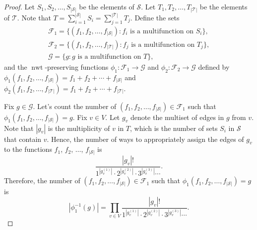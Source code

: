 \documentclass[11pt]{article}
\theoremstyle{definition}
\numberwithin{equation}{section}
\newcommand{\mtp}[1]{^{(#1)}} \newcommand{\graph}{\varGamma}
\newcommand{\vertices}{V}
\DeclareMathOperator{\normalizedweight}{nwt}
\begin{document}
\begin{proof}
    Let \(S_1, S_2, \dots, S_{|\mathcal{S}|}\) be the elements of \(\mathcal{S}\).
    Let \(T_1, T_2, \dots, T_{|\mathcal{T}|}\) be the elements of \(\mathcal{T}\).
    Note that \(T = \sum_{i=1}^{|\mathcal{S}|} S_i = \sum_{j=1}^{|\mathcal{T}|} T_j\).
    Define the sets
    \begin{gather*}
        \mathcal{F}_1 = \{ (f_1, f_2, \dots, f_{|\mathcal{S}|}) : f_i \text{ is a multifunction on } S_i \}, \\
        \mathcal{F}_2 = \{ (f_1, f_2, \dots, f_{|\mathcal{T}|}) : f_j \text{ is a multifunction on } T_j \}, \\
        \mathcal{G} = \{ g : g \text{ is a multifunction on } T \},
    \end{gather*}
    and the \(\normalizedweight\)-preserving functions
    \( \phi_1 \colon \mathcal{F}_1 \to \mathcal{G} \) and
    \( \phi_2 \colon \mathcal{F}_2 \to \mathcal{G} \)
    defined by \(\phi_1(f_1, f_2, \dots, f_{|\mathcal{S}|}) = f_1 + f_2 + \cdots + f_{|\mathcal{S}|}\) and \(\phi_2(f_1, f_2, \dots, f_{|\mathcal{T}|}) = f_1 + f_2 + \cdots + f_{|\mathcal{T}|}\).

    Fix \(g \in \mathcal{G}\).
    Let's count the number of \((f_1, f_2, \dots, f_{|\mathcal{S}|}) \in \mathcal{F}_1\) such that \(\phi_1(f_1, f_2, \dots, f_{|\mathcal{S}|}) = g\).
    Fix \(v \in \vertices\).
    Let \(g_v\) denote the multiset of edges in \(g\) from \(v\).
    Note that \(|g_v|\) is the multiplicity of \(v\) in \(T\),
    which is the number of sets \(S_i\) in \(\mathcal{S}\) that contain \(v\).
    Hence, the number of ways to appropriately assign the edges of \(g_v\) to the functions \(f_1\), \(f_2\), \(\dots\), \(f_{|\mathcal{S}|}\) is
    \begin{equation*}
        \frac{|g_v|!}{1^{\left| g_v\mtp{1} \right|} \cdot 2^{\left| g_v\mtp{2} \right|} \cdot 3^{\left| g_v\mtp{3} \right|} \cdots}.
    \end{equation*}
    Therefore, the number of \((f_1, f_2, \dots, f_{|\mathcal{S}|}) \in \mathcal{F}_1\) such that \(\phi_1(f_1, f_2, \dots, f_{|\mathcal{S}|}) = g\) is
    \begin{equation*}
        \left| \phi_1^{-1}(g) \right| =
        \prod_{v \in \vertices} \frac{\left| g_v \right|!}{1^{\left| g_v\mtp{1} \right|} \cdot 2^{\left| g_v\mtp{2} \right|} \cdot 3^{\left| g_v\mtp{3} \right|} \cdots}.
    \end{equation*}


\end{proof}
\end{document}
